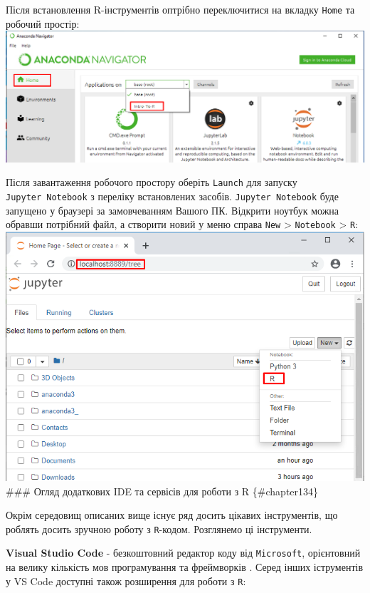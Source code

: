 \documentclass[
]{book}
\begin{document}
Після встановлення R-інструментів оптрібно переключитися на вкладку \texttt{Home} та робочий простір:
\includegraphics{images/chapter1/anaconda_4.png}

Після завантаження робочого простору оберіть \texttt{Launch} для запуску \texttt{Jupyter\ Notebook} з переліку встановлених засобів. \texttt{Jupyter\ Notebook} буде запущено у браузері за замовчеванням Вашого ПК. Відкрити ноутбук можна обравши потрібний файл, а створити новий у меню справа \texttt{New} \textgreater{} \texttt{Notebook} \textgreater{} \texttt{R}:
\includegraphics{images/chapter1/anaconda_6.png}
\#\#\# Огляд додаткових IDE та сервісів для роботи з R \{\#chapter134\}

Окрім середовищ описаних вище існує ряд досить цікавих інструментів, що роблять досить зручною роботу з \texttt{R}-кодом. Розглянемо ці інструменти.

\textbf{Visual Studio Code} - безкоштовний редактор коду від \texttt{Microsoft}, орієнтовний на велику кількість мов програмування та фреймворків \citep{vs-code}. Серед інших іструментів у VS Code доступні також розширення для роботи з \texttt{R}:
\end{document}
